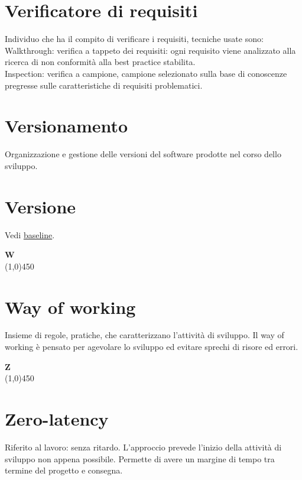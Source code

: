 	\section{Verificatore di requisiti}
	\label{sec:verificatorerequisiti}
	Individuo che ha il compito di verificare i requisiti, tecniche usate sono: \\
	Walkthrough: verifica a tappeto dei requisiti: ogni requisito viene analizzato alla ricerca di non conformità alla best practice stabilita. \\
	Inspection: verifica a campione, campione selezionato sulla base di conoscenze pregresse sulle caratteristiche di requisiti problematici.
	
	\section{Versionamento}
	\label{sec:versionamento}
	Organizzazione e gestione delle versioni del software prodotte nel corso dello sviluppo.

	\section{Versione}
	\label{sec:versione}
	Vedi \hyperref[sec:baseline]{baseline}. \newpage

	{\Huge{\textbf{W}}} \\
	\line(1,0){450}
	
	\section{Way of working}
	\label{sec:wow}
	Insieme di regole, pratiche, che caratterizzano l'attività di sviluppo. Il way of working è pensato per agevolare lo sviluppo ed evitare sprechi di risore ed errori. \newpage

	
	{\Huge{\textbf{Z}}} \\
	\line(1,0){450}
	
	\section{Zero-latency}
	\label{sec:zerolatency}
	Riferito al lavoro: senza ritardo. L'approccio prevede l'inizio della attività di sviluppo non appena possibile. Permette di avere un margine di tempo tra termine del progetto e consegna.
	
